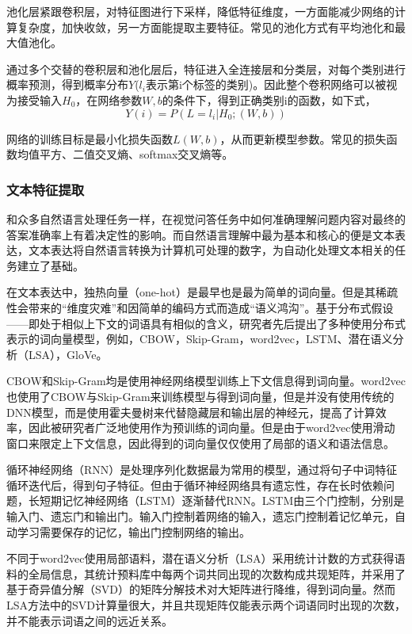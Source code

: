 池化层紧跟卷积层，对特征图进行下采样，降低特征维度，一方面能减少网络的计算复杂度，加快收敛，另一方面能提取主要特征。常见的池化方式有平均池化和最大值池化。

通过多个交替的卷积层和池化层后，特征进入全连接层和分类层，对每个类别进行概率预测，得到概率分布$Y$($l_i$表示第i个标签的类别)。因此整个卷积网络可以被视为接受输入$H_0$，在网络参数$W, b$的条件下，得到正确类别i的函数，如下式，
\begin{equation}
Y(i)=P(L=l_i | H_0; (W, b))
\end{equation}

网络的训练目标是最小化损失函数$L(W, b)$，从而更新模型参数。常见的损失函数均值平方、二值交叉熵、softmax交叉熵等。

\subsubsection{文本特征提取}
和众多自然语言处理任务一样，在视觉问答任务中如何准确理解问题内容对最终的答案准确率上有着决定性的影响。而自然语言理解中最为基本和核心的便是文本表达，文本表达将自然语言转换为计算机可处理的数字，为自动化处理文本相关的任务建立了基础。

在文本表达中，独热向量（one-hot）是最早也是最为简单的词向量。但是其稀疏性会带来的“维度灾难”和因简单的编码方式而造成“语义鸿沟”。基于分布式假设——即处于相似上下文的词语具有相似的含义，研究者先后提出了多种使用分布式表示的词向量模型，例如，CBOW，Skip-Gram，word2vec，LSTM、潜在语义分析（LSA），GloVe。

CBOW和Skip-Gram均是使用神经网络模型训练上下文信息得到词向量。word2vec也使用了CBOW与Skip-Gram来训练模型与得到词向量，但是并没有使用传统的DNN模型，而是使用霍夫曼树来代替隐藏层和输出层的神经元，提高了计算效率，因此被研究者广泛地使用作为预训练的词向量。但是由于word2vec使用滑动窗口来限定上下文信息，因此得到的词向量仅仅使用了局部的语义和语法信息。

循环神经网络（RNN）是处理序列化数据最为常用的模型，通过将句子中词特征循环迭代后，得到句子特征。但由于循环神经网络具有遗忘性，存在长时依赖问题，长短期记忆神经网络（LSTM）逐渐替代RNN。LSTM由三个门控制，分别是输入门、遗忘门和输出门。输入门控制着网络的输入，遗忘门控制着记忆单元，自动学习需要保存的记忆，输出门控制网络的输出。

不同于word2vec使用局部语料，潜在语义分析（LSA）采用统计计数的方式获得语料的全局信息，其统计预料库中每两个词共同出现的次数构成共现矩阵，并采用了基于奇异值分解（SVD）的矩阵分解技术对大矩阵进行降维，得到词向量。然而LSA方法中的SVD计算量很大，并且共现矩阵仅能表示两个词语同时出现的次数，并不能表示词语之间的远近关系。

